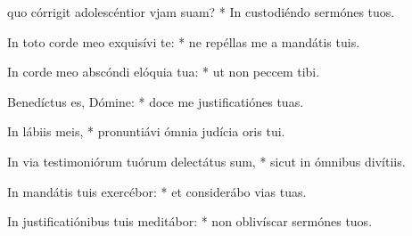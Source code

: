 \begin{psalmus}

 quo córrigit adolescéntior vjam suam? * In custodiéndo sermónes tuos.

In toto corde meo exquisívi te: * ne repéllas me a mandátis tuis.

In corde meo abscóndi elóquia tua: * ut non peccem tibi.

Benedíctus es, Dómine: * doce me justificatiónes tuas.

In lábiis meis, * pronuntiávi ómnia judícia oris tui.

In via testimoniórum tuórum delectátus sum, * sicut in ómnibus divítiis.

In mandátis tuis exercébor: * et considerábo vias tuas.

In justificatiónibus tuis meditábor: * non oblivíscar sermónes tuos.

\end{psalmus}
